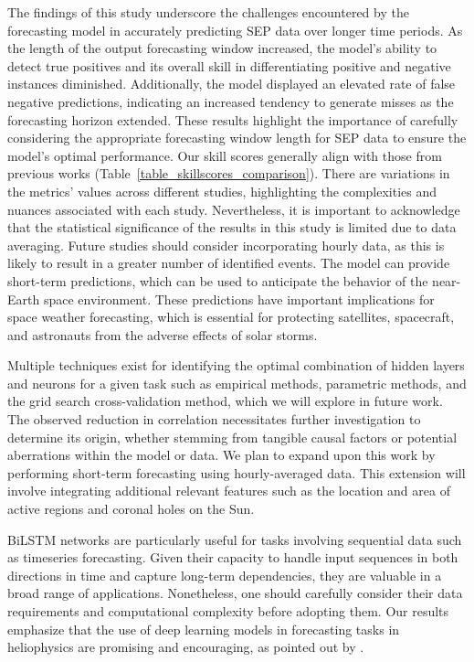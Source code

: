 The findings of this study underscore the challenges encountered by the forecasting model in accurately predicting SEP data over longer time periods. As the length of the output forecasting window increased, the model's ability to detect true positives and its overall skill in differentiating positive and negative instances diminished. Additionally, the model displayed an elevated rate of false negative predictions, indicating an increased tendency to generate misses as the forecasting horizon extended. These results highlight the importance of carefully considering the appropriate forecasting window length for SEP data to ensure the model's optimal performance. Our skill scores generally align with those from previous works (Table~\ref{table_skillscores_comparison}). There are variations in the metrics' values across different studies, highlighting the complexities and nuances associated with each study. Nevertheless, it is important to acknowledge that the statistical significance of the results in this study is limited due to data averaging. Future studies should consider incorporating hourly data, as this is likely to result in a greater number of identified events.
The model can provide short-term predictions, which can be used to anticipate the behavior of the near-Earth space environment. These predictions have important implications for space weather forecasting, which is essential for protecting satellites, spacecraft, and astronauts from the adverse effects of solar storms.

Multiple techniques exist for identifying the optimal combination of hidden layers and neurons for a given task such as empirical methods, parametric methods, and the grid search cross-validation method, which we will explore in future work.
The observed reduction in correlation necessitates further investigation to determine its origin, whether stemming from tangible causal factors or potential aberrations within the model or data.
We plan to expand upon this work by performing short-term forecasting using hourly-averaged data. This extension will involve integrating additional relevant features such as the location and area of active regions and coronal holes on the Sun.

BiLSTM networks are particularly useful for tasks involving sequential data such as timeseries forecasting. Given their capacity to handle input sequences in both directions in time and capture long-term dependencies, they are valuable in a broad range of applications. Nonetheless, one should carefully consider their data requirements and computational complexity before adopting them.
Our results emphasize that the use of deep learning models in forecasting tasks in heliophysics are promising and encouraging, as pointed out by \citet{zhang_2022}.


